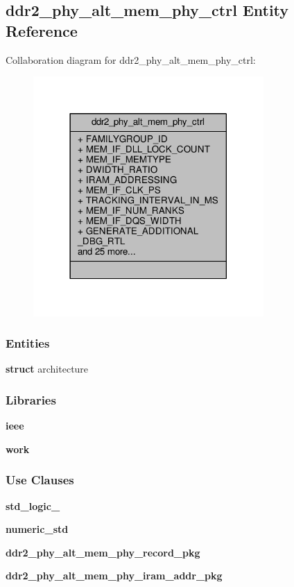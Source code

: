 \subsection{ddr2\+\_\+phy\+\_\+alt\+\_\+mem\+\_\+phy\+\_\+ctrl Entity Reference}
\label{classddr2__phy__alt__mem__phy__ctrl}


Collaboration diagram for ddr2\+\_\+phy\+\_\+alt\+\_\+mem\+\_\+phy\+\_\+ctrl\+:\nopagebreak
\begin{figure}[H]
\begin{center}
\leavevmode
\includegraphics[width=249pt]{dd/dbb/classddr2__phy__alt__mem__phy__ctrl__coll__graph}
\end{center}
\end{figure}
\subsubsection*{Entities}
\begin{DoxyCompactItemize}
\item 
{\bf struct} architecture
\end{DoxyCompactItemize}
\subsubsection*{Libraries}
 \begin{DoxyCompactItemize}
\item 
{\bf ieee} 
\item 
{\bf work} 
\end{DoxyCompactItemize}
\subsubsection*{Use Clauses}
 \begin{DoxyCompactItemize}
\item 
{\bf std\+\_\+logic\+\_}   
\item 
{\bf numeric\+\_\+std}   
\item 
{\bf ddr2\+\_\+phy\+\_\+alt\+\_\+mem\+\_\+phy\+\_\+record\+\_\+pkg}   
\item 
{\bf ddr2\+\_\+phy\+\_\+alt\+\_\+mem\+\_\+phy\+\_\+iram\+\_\+addr\+\_\+pkg}   
\end{DoxyCompactItemize}
